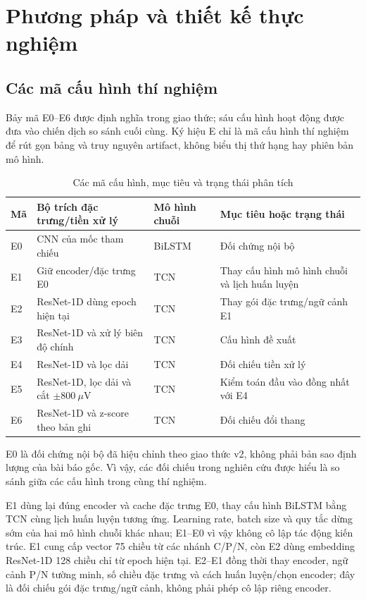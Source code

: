 \section{Phương pháp và thiết kế thực nghiệm}
\label{sec:methodology}

\subsection{Các mã cấu hình thí nghiệm}

Bảy mã E0--E6 được định nghĩa trong giao thức; sáu cấu hình hoạt động được đưa vào chiến dịch so sánh cuối cùng. Ký hiệu E chỉ là mã cấu hình thí nghiệm để rút gọn bảng và truy nguyên artifact, không biểu thị thứ hạng hay phiên bản mô hình.

\begin{table}[H]
\centering
\caption{Các mã cấu hình, mục tiêu và trạng thái phân tích}
\label{tab:experiment_matrix}
\begin{tabularx}{\textwidth}{lYYY}
\toprule
\textbf{Mã} & \textbf{Bộ trích đặc trưng/tiền xử lý} & \textbf{Mô hình chuỗi} & \textbf{Mục tiêu hoặc trạng thái} \\
\midrule
E0 & CNN của mốc tham chiếu & BiLSTM & Đối chứng nội bộ \\
E1 & Giữ encoder/đặc trưng E0 & TCN & Thay cấu hình mô hình chuỗi và lịch huấn luyện \\
E2 & ResNet-1D dùng epoch hiện tại & TCN & Thay gói đặc trưng/ngữ cảnh E1 \\
E3 & ResNet-1D và xử lý biên độ chính & TCN & Cấu hình đề xuất \\
E4 & ResNet-1D và lọc dải & TCN & Đối chiếu tiền xử lý \\
E5 & ResNet-1D, lọc dải và cắt $\pm800~\mu\mathrm{V}$ & TCN & Kiểm toán đầu vào đồng nhất với E4 \\
E6 & ResNet-1D và z-score theo bản ghi & TCN & Đối chiếu đổi thang \\
\bottomrule
\end{tabularx}
\end{table}

E0 là đối chứng nội bộ đã hiệu chỉnh theo giao thức v2, không phải bản sao định lượng của bài báo gốc. Vì vậy, các đối chiếu trong nghiên cứu được hiểu là so sánh giữa các cấu hình trong cùng thí nghiệm.

E1 dùng lại đúng encoder và cache đặc trưng E0, thay cấu hình BiLSTM bằng TCN cùng lịch huấn luyện tương ứng. Learning rate, batch size và quy tắc dừng sớm của hai mô hình chuỗi khác nhau; E1--E0 vì vậy không cô lập tác động kiến trúc. E1 cung cấp vector 75 chiều từ các nhánh C/P/N, còn E2 dùng embedding ResNet-1D 128 chiều chỉ từ epoch hiện tại. E2--E1 đồng thời thay encoder, ngữ cảnh P/N tường minh, số chiều đặc trưng và cách huấn luyện/chọn encoder; đây là đối chiếu gói đặc trưng/ngữ cảnh, không phải phép cô lập riêng encoder.

